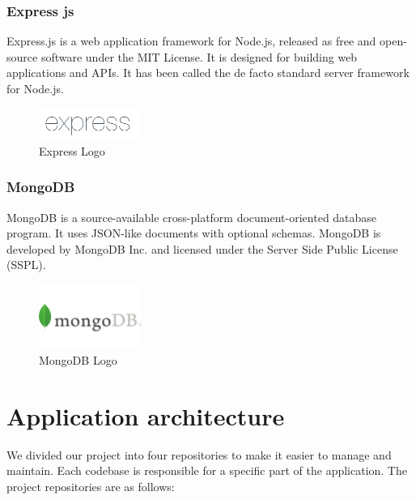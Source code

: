 \subsubsection{Express js}
Express.js is a web application framework for Node.js, released as free
and open-source software under the MIT License. It is designed for building
web applications and APIs. It has been called the de facto standard server framework for Node.js.

\begin{figure}[h!]
      \centering
      \includegraphics[width=0.3\textwidth]{../images/Expressjs.png}
      \caption{Express Logo}
      \label{fig:express}
\end{figure}

\subsubsection{MongoDB}
MongoDB is a source-available cross-platform document-oriented database program.
It uses JSON-like documents with optional schemas. MongoDB is developed by
MongoDB Inc. and licensed under the Server Side Public License (SSPL).
\begin{figure}[h!]
      \centering
      \includegraphics[width=0.3\textwidth]{../images/mongodb.png}
      \caption{MongoDB Logo}
      \label{fig:mongodb}
\end{figure}
\bigbreak
\section{Application architecture}
We divided our project into four repositories to make it easier to manage and
maintain. Each codebase is responsible for a specific part of the application.
The project repositories are as follows:

